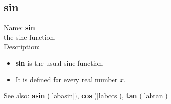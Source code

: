 \subsection{sin}
\label{labsin}
\noindent Name: \textbf{sin}\\
the sine function.\\
\noindent Description: \begin{itemize}

\item \textbf{sin} is the usual sine function.

\item It is defined for every real number $x$.
\end{itemize}
See also: \textbf{asin} (\ref{labasin}), \textbf{cos} (\ref{labcos}), \textbf{tan} (\ref{labtan})
